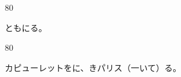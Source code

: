 \documentclass[tate,paper=b6j,jafontsize=9pt]{jlreq}
\begin{document}
\begin{azconvIndented}{8\zw}{0\zw}

ともにる。

\end{azconvIndented}


\begin{azconvIndented}{8\zw}{0\zw}

カピューレットをに、きパリス（一いて）る。

\end{azconvIndented}
\end{document}
